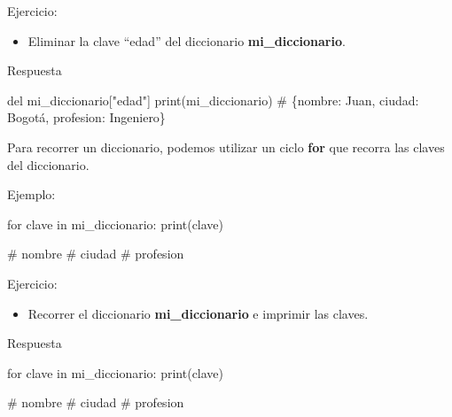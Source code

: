 \documentclass[
  a4paper,
  DIV=11,
  numbers=noendperiod,
  onepage,
  openany]{scrreprt}
\newenvironment{Shaded}{\begin{snugshade}}{\end{snugshade}}
\newcommand{\BuiltInTok}[1]{\textcolor[rgb]{0.00,0.23,0.31}{#1}}
\newcommand{\CommentTok}[1]{\textcolor[rgb]{0.37,0.37,0.37}{#1}}
\newcommand{\ControlFlowTok}[1]{\textcolor[rgb]{0.00,0.23,0.31}{#1}}
\newcommand{\KeywordTok}[1]{\textcolor[rgb]{0.00,0.23,0.31}{#1}}
\newcommand{\NormalTok}[1]{\textcolor[rgb]{0.00,0.23,0.31}{#1}}
\newcommand{\StringTok}[1]{\textcolor[rgb]{0.13,0.47,0.30}{#1}}
\providecommand{\tightlist}{%
  \setlength{\itemsep}{0pt}\setlength{\parskip}{0pt}}\usepackage{longtable,booktabs,array}
\begin{document}
Ejercicio:

\begin{itemize}
\tightlist
\item
  Eliminar la clave ``edad'' del diccionario \textbf{mi\_diccionario}.
\end{itemize}

Respuesta

\begin{Shaded}
\begin{Highlighting}[]
\KeywordTok{del}\NormalTok{ mi\_diccionario[}\StringTok{"edad"}\NormalTok{]}
\BuiltInTok{print}\NormalTok{(mi\_diccionario)  }\CommentTok{\# \{\textquotesingle{}nombre\textquotesingle{}: \textquotesingle{}Juan\textquotesingle{}, \textquotesingle{}ciudad\textquotesingle{}: \textquotesingle{}Bogotá\textquotesingle{}, \textquotesingle{}profesion\textquotesingle{}: \textquotesingle{}Ingeniero\textquotesingle{}\}}
\end{Highlighting}
\end{Shaded}

Para recorrer un diccionario, podemos utilizar un ciclo \textbf{for} que
recorra las claves del diccionario.

Ejemplo:

\begin{Shaded}
\begin{Highlighting}[]
\ControlFlowTok{for}\NormalTok{ clave }\KeywordTok{in}\NormalTok{ mi\_diccionario:}
    \BuiltInTok{print}\NormalTok{(clave)}

\CommentTok{\# nombre}
\CommentTok{\# ciudad}
\CommentTok{\# profesion}
\end{Highlighting}
\end{Shaded}

Ejercicio:

\begin{itemize}
\tightlist
\item
  Recorrer el diccionario \textbf{mi\_diccionario} e imprimir las
  claves.
\end{itemize}

Respuesta

\begin{Shaded}
\begin{Highlighting}[]
\ControlFlowTok{for}\NormalTok{ clave }\KeywordTok{in}\NormalTok{ mi\_diccionario:}
    \BuiltInTok{print}\NormalTok{(clave)}

\CommentTok{\# nombre}
\CommentTok{\# ciudad}
\CommentTok{\# profesion}
\end{Highlighting}
\end{Shaded}
\end{document}
